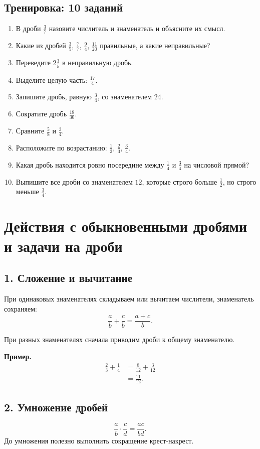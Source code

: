 \documentclass[12pt,a4paper]{article}
\newcommand{\trainingtitle}{\subsection*{Тренировка: 10 заданий}}
\begin{document}
\trainingtitle
\begin{enumerate}
  \item В дроби $\frac37$ назовите числитель и знаменатель и объясните их смысл.
  \item Какие из дробей $\frac35$, $\frac77$, $\frac94$, $\frac{11}{20}$ правильные, а какие неправильные?
  \item Переведите $2\frac35$ в неправильную дробь.
  \item Выделите целую часть: $\frac{17}{4}$.
  \item Запишите дробь, равную $\frac34$, со знаменателем $24$.
  \item Сократите дробь $\frac{18}{30}$.
  \item Сравните $\frac58$ и $\frac34$.
  \item Расположите по возрастанию: $\frac12$, $\frac23$, $\frac34$.
  \item Какая дробь находится ровно посередине между $\frac14$ и $\frac34$ на числовой прямой?
  \item Выпишите все дроби со знаменателем $12$, которые строго больше $\frac12$, но строго меньше $\frac34$.
\end{enumerate}

\newpage

\section{Действия с обыкновенными дробями и задачи на дроби}

\subsection*{1. Сложение и вычитание}
При одинаковых знаменателях складываем или вычитаем числители, знаменатель сохраняем:
\[
\frac ab+\frac cb=\frac{a+c}{b}.
\]

При разных знаменателях сначала приводим дроби к общему знаменателю.

\textbf{Пример.}
\begin{align*}
\frac23+\frac14&=\frac8{12}+\frac3{12}\\
&=\frac{11}{12}.
\end{align*}

\subsection*{2. Умножение дробей}
\[
\frac ab\cdot\frac cd=\frac{ac}{bd}.
\]
До умножения полезно выполнить сокращение крест-накрест.
\end{document}
